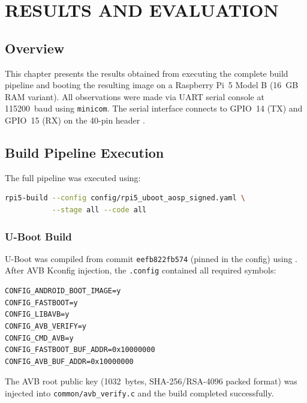 \chapter{RESULTS AND EVALUATION}
\label{ch:results}

\section{Overview}

This chapter presents the results obtained from executing the complete build pipeline and booting the resulting image on a Raspberry Pi~5 Model B (16~GB RAM variant). All observations were made via UART serial console at 115200~baud using \texttt{minicom}. The serial interface connects to GPIO~14 (TX) and GPIO~15 (RX) on the 40-pin header \cite{rpi_uart_pinout}.

\section{Build Pipeline Execution}

The full pipeline was executed using:

\begin{lstlisting}[language=bash]
rpi5-build --config config/rpi5_uboot_aosp_signed.yaml \
           --stage all --code all
\end{lstlisting}

\subsection{U-Boot Build}

U-Boot was compiled from commit \texttt{eefb822fb574} (pinned in the config) using . After AVB Kconfig injection, the \texttt{.config} contained all required symbols:

\begin{lstlisting}
CONFIG_ANDROID_BOOT_IMAGE=y
CONFIG_FASTBOOT=y
CONFIG_LIBAVB=y
CONFIG_AVB_VERIFY=y
CONFIG_CMD_AVB=y
CONFIG_FASTBOOT_BUF_ADDR=0x10000000
CONFIG_AVB_BUF_ADDR=0x10000000
\end{lstlisting}

The AVB root public key (1032~bytes, SHA-256/RSA-4096 packed format) was injected into \texttt{common/avb\_verify.c} and the build completed successfully.

